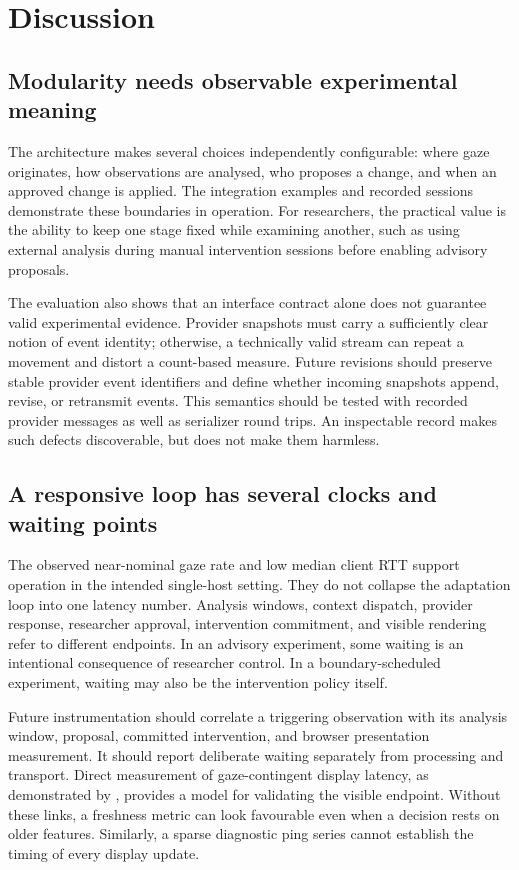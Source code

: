 \section{Discussion}
\label{sec:discussion}

\subsection{Modularity needs observable experimental meaning}

The architecture makes several choices independently configurable: where gaze originates, how observations are analysed, who proposes a change, and when an approved change is applied. The integration examples and recorded sessions demonstrate these boundaries in operation. For researchers, the practical value is the ability to keep one stage fixed while examining another, such as using external analysis during manual intervention sessions before enabling advisory proposals.

The evaluation also shows that an interface contract alone does not guarantee valid experimental evidence. Provider snapshots must carry a sufficiently clear notion of event identity; otherwise, a technically valid stream can repeat a movement and distort a count-based measure. Future revisions should preserve stable provider event identifiers and define whether incoming snapshots append, revise, or retransmit events. This semantics should be tested with recorded provider messages as well as serializer round trips. An inspectable record makes such defects discoverable, but does not make them harmless.

\subsection{A responsive loop has several clocks and waiting points}

The observed near-nominal gaze rate and low median client RTT support operation in the intended single-host setting. They do not collapse the adaptation loop into one latency number. Analysis windows, context dispatch, provider response, researcher approval, intervention commitment, and visible rendering refer to different endpoints. In an advisory experiment, some waiting is an intentional consequence of researcher control. In a boundary-scheduled experiment, waiting may also be the intervention policy itself.

Future instrumentation should correlate a triggering observation with its analysis window, proposal, committed intervention, and browser presentation measurement. It should report deliberate waiting separately from processing and transport. Direct measurement of gaze-contingent display latency, as demonstrated by \citet{saunders2014latency}, provides a model for validating the visible endpoint. Without these links, a freshness metric can look favourable even when a decision rests on older features. Similarly, a sparse diagnostic ping series cannot establish the timing of every display update.


